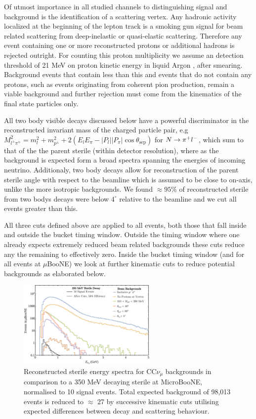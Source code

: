 \documentclass[11pt, a4paper]{article}
\def\muboone{MicroBooNE}
\def\ster{\ensuremath N}
\begin{document}
Of utmost importance in all studied channels to distinguishing signal and
background is the identification of a scattering vertex. Any hadronic activity
localized at the beginning of the lepton track is a smoking gun signal for beam
related scattering from deep-inelastic or quasi-elastic scattering. Therefore
any event containing one or more reconstructed protons or additional hadrons is
rejected outright. For counting this proton multiplicity we assume an detection
threshold of 21 MeV on proton kinetic energy in liquid Argon \cite{Acciarri:2014gev}, after smearing.
Background events that contain less than this and events that do not contain
any protons, such as events originating from coherent pion production, remain a
viable background and further rejection must come from the kinematics of the
final state particles only.

All two body visible decays discussed below have a powerful discriminator in
the reconstructed invariant mass of the charged particle pair, e.g  $M_{l^\pm
\pi^\mp}^2=m_l^2+m_{p^\pm}^2+ 2(E_l E_\pi - |P_l||P_\pi|\cos\theta_\text{sep})$
for $\ster\rightarrow \pi^+ l^-$, which sum to that of the the parent sterile
(within detector resolution), where as the background is expected form a broad
spectra spanning the energies of incoming neutrino. Additionaly, two body
decays allow for reconstruction of the parent sterile angle with respect to the
beamline which is assumed to be close to on-axis, unlike the more isotropic
backgrounds. We found $\approx 95$\% of reconstructed sterile from two bodys
decays were below $4^\circ$ relative to the beamline and we cut all events
greater than this. 

All three cuts defined above are applied to all events, both those that fall inside and outside the bucket timing window. Outside the timing window where one already expects extremely reduced beam related backgrounds these cuts reduce any the remaining to effectively zero. Inside the bucket timing window (and for all events at $\mu$BooNE) we look at further kinematic cuts to reduce potential backgrounds as elaborated below.

\begin{figure}[h]
\center
\includegraphics[width=0.6\textwidth,clip,trim=0 0 0 0]{figures/mu_pi_cutflow.pdf}

\caption{\label{fig:mu_pi_cutflow} Reconstructed sterile energy spectra for
CC$\nu_\mu$ backgrounds in comparison to a 350 MeV decaying sterile at
\muboone, normalised to 10 signal events. Total expected background of 98,013
events is reduced to $\approx$ 27 by successive kinematic cuts utilising
expected differences between decay and scattering behaviour. }

\end{figure}
\end{document}
